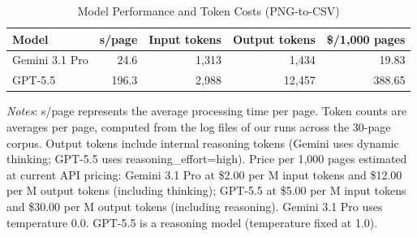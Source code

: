 \begin{table}[htbp]
\centering
\small
\caption{Model Performance and Token Costs (PNG-to-CSV)}
\label{tab:cost-revision}
\begin{tabular}{l r r r r}
\toprule
\textbf{Model} & \textbf{s/page} & \textbf{Input tokens} & \textbf{Output tokens} & \textbf{\$/1,000 pages} \\
\midrule
Gemini 3.1 Pro & 24.6 & 1,313 & 1,434 & 19.83 \\
GPT-5.5 & 196.3 & 2,988 & 12,457 & 388.65 \\
\bottomrule
\end{tabular}

\vspace{0.5em}
\begin{minipage}{\linewidth}
\footnotesize
\textit{Notes}: s/page represents the average processing time per page. Token counts are averages per page, computed from the log files of our runs across the 30-page corpus. Output tokens include internal reasoning tokens (Gemini uses dynamic thinking; GPT-5.5 uses reasoning\_effort=high). Price per 1,000 pages estimated at current API pricing: Gemini 3.1 Pro at \$2.00 per M input tokens and \$12.00 per M output tokens (including thinking); GPT-5.5 at \$5.00 per M input tokens and \$30.00 per M output tokens (including reasoning). Gemini 3.1 Pro uses temperature 0.0. GPT-5.5 is a reasoning model (temperature fixed at 1.0).
\end{minipage}
\end{table}

